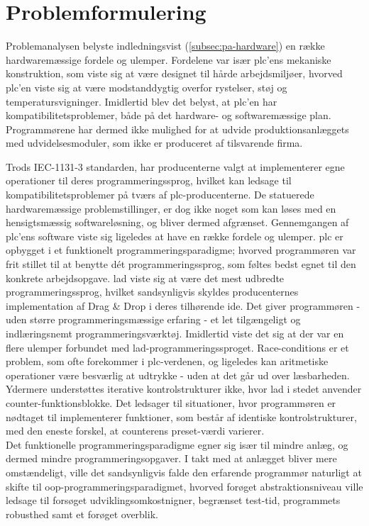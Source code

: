\section{Problemformulering}
Problemanalysen belyste indledningsvist (\ref{subsec:pa-hardware}) en række hardwaremæssige fordele og ulemper. Fordelene var især \gls{plc}'ens mekaniske konstruktion, som viste sig at være designet til hårde arbejdsmiljøer, hvorved \gls{plc}'en viste sig at være modstanddygtig overfor rystelser, støj og temperatursvigninger. Imidlertid blev det belyst, at \gls{plc}'en har kompatibilitetsproblemer, både på det hardware- og softwaremæssige plan. Programmørene har dermed ikke mulighed for at udvide produktionsanlæggets med udvidelsesmoduler, som ikke er produceret af tilsvarende firma.

Trods IEC-1131-3 standarden, har producenterne valgt at implementerer egne operationer til deres programmeringssprog, hvilket kan ledsage til kompatibilitetsproblemer på tværs af \gls{plc}-producenterne. De statuerede hardwaremæssige problemstillinger, er dog ikke noget som kan løses med en hensigtsmæssig softwareløsning, og bliver dermed afgrænset. 
Gennemgangen af \gls{plc}'ens software viste sig ligeledes at have en række fordele og ulemper. \gls{plc} er opbygget i et funktionelt programmeringsparadigme; hvorved programmøren var frit stillet til at benytte dét programmeringssprog, som føltes bedst egnet til den konkrete arbejdsopgave. \gls{lad} viste sig at være det mest udbredte programmeringssprog, hvilket sandsynligvis skyldes producenternes implementation af Drag \& Drop i deres tilhørende \gls{ide}. Det giver programmøren - uden større programmeringsmæssige erfaring - et let tilgængeligt og indlæringsnemt programmeringsværktøj. Imidlertid viste det sig at der var en flere ulemper forbundet med \gls{lad}-programmeringssproget. Race-conditions er et problem, som ofte forekommer i \gls{plc}-verdenen, og ligeledes kan aritmetiske operationer være besværlig at udtrykke - uden at det går ud over læsbarheden. Ydermere understøttes iterative kontrolstrukturer ikke, hvor \gls{lad} i stedet anvender counter-funktionsblokke. Det ledsager til situationer, hvor programmøren er nødtaget til implementerer funktioner, som består af identiske kontrolstrukturer, med den eneste forskel, at counterens preset-værdi varierer. \\

\noindent Det funktionelle programmeringsparadigme egner sig især til mindre anlæg, og dermed mindre programmeringsopgaver. I takt med at anlægget bliver mere omstændeligt, ville det sandsynligvis falde den erfarende programmør naturligt at skifte til \gls{oop}-programmeringsparadigmet, hvorved forøget abstraktionsniveau ville ledsage til forsøget udviklingsomkostnigner, begrænset test-tid, programmets robusthed samt et forøget overblik. 

